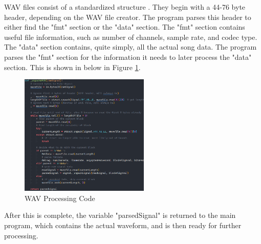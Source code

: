 \documentclass[UTF8, 12pt]{article}
\begin{document}
    WAV files consist of a standardized structure \cite{wav}. They begin with a 44-76 byte header, depending on the WAV file creator. The program parses this header to either find the "fmt" section or the "data" section. The "fmt" section contains useful file information, such as number of channels, sample rate, and codec type. The "data" section contains, quite simply, all the actual song data. The program parses the "fmt" section for the information it needs to later process the "data" section. This is shown in below in Figure \ref{wav_code}.
    \begin{figure}[h!]
        \centering
        \includegraphics[width=0.55\textwidth]{wave_parse}
        \caption{WAV Processing Code}
        \label{wav_code}
    \end{figure}
    After this is complete, the variable "parsedSignal" is returned to the main program, which contains the actual waveform, and is then ready for further processing.
\end{document}
